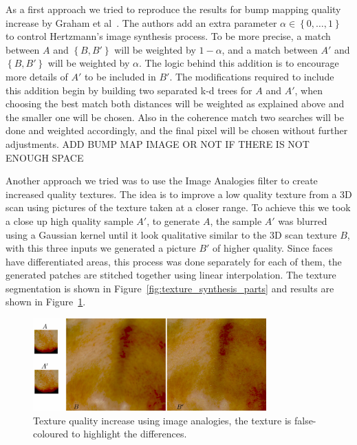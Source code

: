 \documentclass[11pt]{article}
\begin{document}
As a first approach we tried to reproduce the results for bump mapping quality increase by Graham et al~\cite{Graham2013}.
The authors add an extra parameter $\alpha \in \left\lbrace 0, \ldots, 1 \right\rbrace$ to control Hertzmann's image synthesis process.
To be more precise, a match between $A$ and $\left\lbrace B,B' \right\rbrace$ will be weighted by $1 - \alpha$, and a match between $A'$ and $\left\lbrace B,B' \right\rbrace$ will be weighted by $\alpha$.
The logic behind this addition is to encourage more details of $A'$ to be included in $B'$.
The modifications required to include this addition begin by building two separated k-d trees for $A$ and $A'$, when choosing the best match both distances will be weighted as explained above and the smaller one will be chosen.
Also in the coherence match two searches will be done and weighted accordingly, and the final pixel will be chosen without further adjustments.
ADD BUMP MAP IMAGE OR NOT IF THERE IS NOT ENOUGH SPACE

Another approach we tried was to use the Image Analogies filter to create increased quality textures.
The idea is to improve a low quality texture from a 3D scan using pictures of the texture taken at a closer range.
To achieve this we took a close up high quality sample $A'$, to generate $A$, the sample $A'$ was blurred using a Gaussian kernel until it look qualitative similar to the 3D scan texture $B$, with this three inputs we generated a picture $B'$ of higher quality.
Since faces have differentiated areas, this process was done separately for each of them, the generated patches are stitched together using linear interpolation.
The texture segmentation is shown in Figure~\ref{fig:texture_synthesis_parts} and results are shown in Figure~\ref{fig:texture_synthesis}.

\begin{figure}[htbp!]
\centering
\includegraphics[width=0.8\textwidth]{img/texture_synthesis}
	\caption{ Texture quality increase using image analogies, the texture is false-coloured to highlight the differences.}
	\label{fig:texture_synthesis}
\end{figure}
\end{document}
